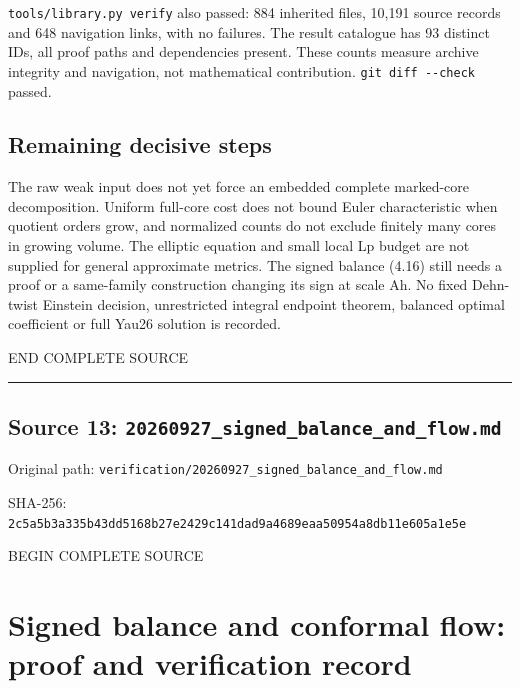 \documentclass[
  10pt,
]{article}
\begin{document}
\texttt{tools/library.py\ verify} also passed: 884 inherited files,
10,191 source records and 648 navigation links, with no failures. The
result catalogue has 93 distinct IDs, all proof paths and dependencies
present. These counts measure archive integrity and navigation, not
mathematical contribution. \texttt{git\ diff\ -\/-check} passed.

\hypertarget{remaining-decisive-steps}{%
\subsection{Remaining decisive steps}\label{remaining-decisive-steps}}

The raw weak input does not yet force an embedded complete marked-core
decomposition. Uniform full-core cost does not bound Euler
characteristic when quotient orders grow, and normalized counts do not
exclude finitely many cores in growing volume. The elliptic equation and
small local Lp budget are not supplied for general approximate metrics.
The signed balance (4.16) still needs a proof or a same-family
construction changing its sign at scale Ah. No fixed Dehn-twist Einstein
decision, unrestricted integral endpoint theorem, balanced optimal
coefficient or full Yau26 solution is recorded.

END COMPLETE SOURCE

\begin{center}\rule{0.5\linewidth}{0.5pt}\end{center}

\hypertarget{source-13-20260927_signed_balance_and_flow.md}{%
\subsection{Source 13:
\nolinkurl{20260927_signed_balance_and_flow.md}}\label{source-13-20260927_signed_balance_and_flow.md}}

Original path:
\nolinkurl{verification/20260927_signed_balance_and_flow.md}

SHA-256:
\nolinkurl{2c5a5b3a335b43dd5168b27e2429c141dad9a4689eaa50954a8db11e605a1e5e}

BEGIN COMPLETE SOURCE

\hypertarget{signed-balance-and-conformal-flow-proof-and-verification-record}{%
\section{Signed balance and conformal flow: proof and verification
record}\label{signed-balance-and-conformal-flow-proof-and-verification-record}}
\end{document}
